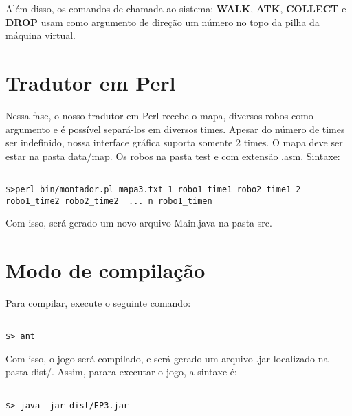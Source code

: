\documentclass[11pt]{article}
\begin{document}
Além disso, os comandos de chamada ao sistema: \textbf{WALK}, \textbf{ATK}, \textbf{COLLECT} e \textbf{DROP} usam como argumento de direção um número no topo da pilha da máquina virtual.







\section{Tradutor em Perl}

Nessa fase, o nosso tradutor em Perl recebe o mapa, diversos robos como argumento e é possível separá-los em diversos times. Apesar do número de times ser indefinido, nossa interface gráfica suporta somente 2 times. O mapa deve ser estar na pasta data/map. Os robos na pasta test e com extensão .asm.
Sintaxe:

\begin{verbatim}

$>perl bin/montador.pl mapa3.txt 1 robo1_time1 robo2_time1 2 robo1_time2 robo2_time2  ... n robo1_timen

\end{verbatim}

Com isso, será gerado um novo arquivo Main.java na pasta src.

\section{Modo de compilação}

Para compilar, execute o seguinte comando:

\begin{verbatim}

$> ant

\end{verbatim}

Com isso, o jogo será compilado, e será gerado um arquivo .jar localizado na pasta dist/. Assim, parara executar o jogo, a sintaxe é:

\begin{verbatim}

$> java -jar dist/EP3.jar

\end{verbatim}
\end{document}
